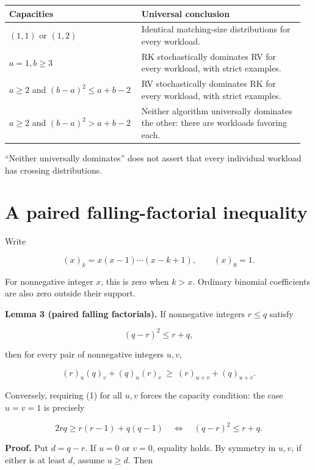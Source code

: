 \begin{center}
\renewcommand{\arraystretch}{1.15}
\begin{tabular}{@{}p{0.43\linewidth}p{0.53\linewidth}@{}}
\toprule
\textbf{Capacities} & \textbf{Universal conclusion} \\
\midrule

\((1,1)\) or \((1,2)\) & Identical matching-size distributions for every workload. \\
\(a=1,b\ge 3\) & RK stochastically dominates RV for every workload, with strict examples. \\
\(a\ge 2\) and \((b-a)^2 \le  a+b-2\) & RV stochastically dominates RK for every workload, with strict examples. \\
\(a\ge 2\) and \((b-a)^2 > a+b-2\) & Neither algorithm universally dominates the other: there are workloads favoring each. \\
\bottomrule
\end{tabular}
\end{center}

``Neither universally dominates'' does not assert that every individual workload has crossing distributions.

\section{A paired falling-factorial inequality}\label{a-paired-falling-factorial-inequality}

Write

\[
(x)_k=x(x-1)\cdots(x-k+1),\qquad (x)_0=1.
\]

For nonnegative integer \(x\), this is zero when \(k>x\). Ordinary binomial coefficients are also zero outside their support.

\textbf{Lemma 3 (paired falling factorials).} If nonnegative integers \(r\le q\) satisfy

\[
(q-r)^2\le r+q,
\]

then for every pair of nonnegative integers \(u,v\),

\[
\boxed{(r)_u(q)_v+(q)_u(r)_v\ \ge\ (r)_{u+v}+(q)_{u+v}.}\tag{1}
\]

Conversely, requiring (1) for all \(u,v\) forces the capacity condition: the case \(u=v=1\) is precisely

\[
2rq\ge r(r-1)+q(q-1)
\quad\Longleftrightarrow\quad (q-r)^2\le r+q.
\]

\textbf{Proof.} Put \(d=q-r\). If \(u=0\) or \(v=0\), equality holds. By symmetry in \(u,v\), if either is at least \(d\), assume \(u\ge d\). Then

